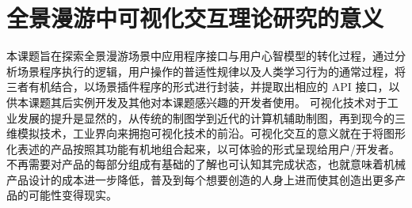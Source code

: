 \section{全景漫游中可视化交互理论研究的意义}
本课题旨在探索全景漫游场景中应用程序接口与用户心智模型的转化过程，通过分析场景程序执行的逻辑，用户操作的普适性规律以及人类学习行为的通常过程，将三者有机结合，以场景插件程序的形式进行封装，并提取出相应的 API 接口，以供本课题其后实例开发及其他对本课题感兴趣的开发者使用。
可视化技术对于工业发展的提升是显然的，从传统的制图学到近代的计算机辅助制图，再到现今的三维模拟技术，工业界向来拥抱可视化技术的前沿。可视化交互的意义就在于将图形化表述的产品按照其功能有机地组合起来，以可体验的形式呈现给用户/开发者。不再需要对产品的每部分组成有基础的了解也可认知其完成状态，也就意味着机械产品设计的成本进一步降低，普及到每个想要创造的人身上进而使其创造出更多产品的可能性变得现实。